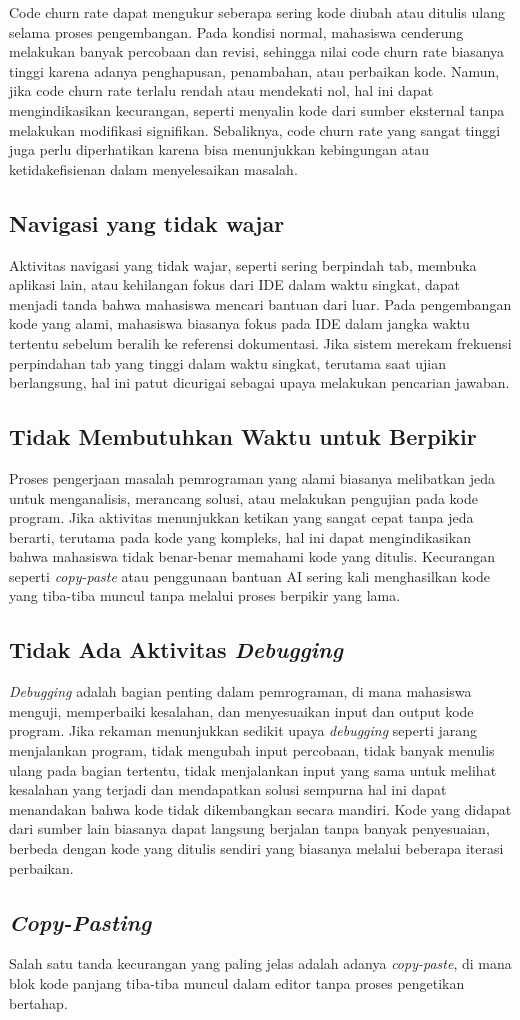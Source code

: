Code churn rate dapat mengukur seberapa sering kode diubah atau ditulis ulang selama proses pengembangan. Pada kondisi normal, mahasiswa cenderung melakukan banyak percobaan dan revisi, sehingga nilai code churn rate biasanya tinggi karena adanya penghapusan, penambahan, atau perbaikan kode. Namun, jika code churn rate terlalu rendah atau mendekati nol, hal ini dapat mengindikasikan kecurangan, seperti menyalin kode dari sumber eksternal tanpa melakukan modifikasi signifikan. Sebaliknya, code churn rate yang sangat tinggi juga perlu diperhatikan karena bisa menunjukkan kebingungan atau ketidakefisienan dalam menyelesaikan masalah.

\subsection{Navigasi yang tidak wajar}

Aktivitas navigasi yang tidak wajar, seperti sering berpindah tab, membuka aplikasi lain, atau kehilangan fokus dari IDE dalam waktu singkat, dapat menjadi tanda bahwa mahasiswa mencari bantuan dari luar. Pada pengembangan kode yang alami, mahasiswa biasanya fokus pada IDE dalam jangka waktu tertentu sebelum beralih ke referensi dokumentasi. Jika sistem merekam frekuensi perpindahan tab yang tinggi dalam waktu singkat, terutama saat ujian berlangsung, hal ini patut dicurigai sebagai upaya melakukan pencarian jawaban.

\subsection{Tidak Membutuhkan Waktu untuk Berpikir}

Proses pengerjaan masalah pemrograman yang alami biasanya melibatkan jeda untuk menganalisis, merancang solusi, atau melakukan pengujian pada kode program. Jika aktivitas menunjukkan ketikan yang sangat cepat tanpa jeda berarti, terutama pada kode yang kompleks, hal ini dapat mengindikasikan bahwa mahasiswa tidak benar-benar memahami kode yang ditulis. Kecurangan seperti \textit{copy-paste} atau penggunaan bantuan AI sering kali menghasilkan kode yang tiba-tiba muncul tanpa melalui proses berpikir yang lama.

\subsection{Tidak Ada Aktivitas \textit{Debugging}}

\textit{Debugging} adalah bagian penting dalam pemrograman, di mana mahasiswa menguji, memperbaiki kesalahan, dan menyesuaikan input dan output kode program. Jika rekaman menunjukkan sedikit upaya \textit{debugging} seperti jarang menjalankan program, tidak mengubah input percobaan, tidak banyak menulis ulang pada bagian tertentu, tidak menjalankan input yang sama untuk melihat kesalahan yang terjadi dan mendapatkan solusi sempurna hal ini dapat menandakan bahwa kode tidak dikembangkan secara mandiri. Kode yang didapat dari sumber lain biasanya dapat langsung berjalan tanpa banyak penyesuaian, berbeda dengan kode yang ditulis sendiri yang biasanya melalui beberapa iterasi perbaikan.

\subsection{\textit{Copy-Pasting}}

Salah satu tanda kecurangan yang paling jelas adalah adanya \textit{copy-paste}, di mana blok kode panjang tiba-tiba muncul dalam editor tanpa proses pengetikan bertahap.